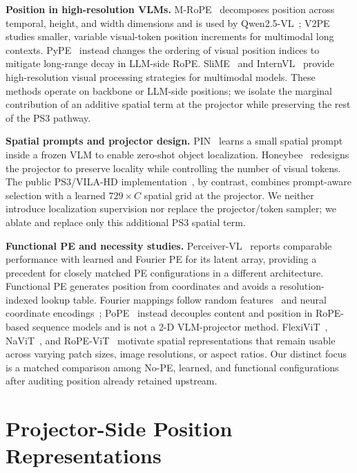 \documentclass{article}
\begin{document}
\noindent\textbf{Position in high-resolution VLMs.}
M-RoPE~\cite{mrope} decomposes position across temporal,
height, and width dimensions and is used by
Qwen2.5-VL~\cite{qwen25vl}; V2PE~\cite{v2pe}
studies smaller, variable visual-token position increments for
multimodal long contexts. PyPE~\cite{pype} instead changes the
ordering of visual position indices to mitigate long-range decay
in LLM-side RoPE. SliME~\cite{llava_hd} and
InternVL~\cite{internvl} provide high-resolution visual
processing strategies for multimodal models. These
methods operate on backbone or LLM-side positions; we isolate
the marginal contribution of an additive spatial term at the
projector while preserving the rest of the PS3 pathway.

\noindent\textbf{Spatial prompts and projector design.}
PIN~\cite{pin} learns a small spatial prompt inside a frozen VLM
to enable zero-shot object localization. Honeybee~\cite{honeybee}
redesigns the projector to preserve locality while controlling
the number of visual tokens. The public PS3/VILA-HD implementation~\cite{ps3}, by contrast,
combines prompt-aware selection with a learned
$729\times C$ spatial grid at the projector. We neither introduce localization supervision nor
replace the projector/token sampler; we ablate and replace only
this additional PS3 spatial term.

\noindent\textbf{Functional PE and necessity studies.}
Perceiver-VL~\cite{perceivervl} reports comparable performance with learned and Fourier PE for its latent array, providing a precedent for closely matched PE configurations in a different architecture. Functional PE generates position from coordinates
and avoids a resolution-indexed lookup table. Fourier mappings follow random
features~\cite{rahimi2007} and neural coordinate
encodings~\cite{tancik2020};
PoPE~\cite{pope_pe} instead decouples content and position in RoPE-based sequence models and is not a 2-D VLM-projector method. FlexiViT~\cite{flexivit}, NaViT~\cite{navit}, and
RoPE-ViT~\cite{ropevit} motivate spatial representations
that remain usable across varying patch sizes, image
resolutions, or aspect ratios.
Our distinct focus is a matched comparison among No-PE,
learned, and functional configurations after auditing position
already retained upstream.

\section{Projector-Side Position Representations}
\end{document}
